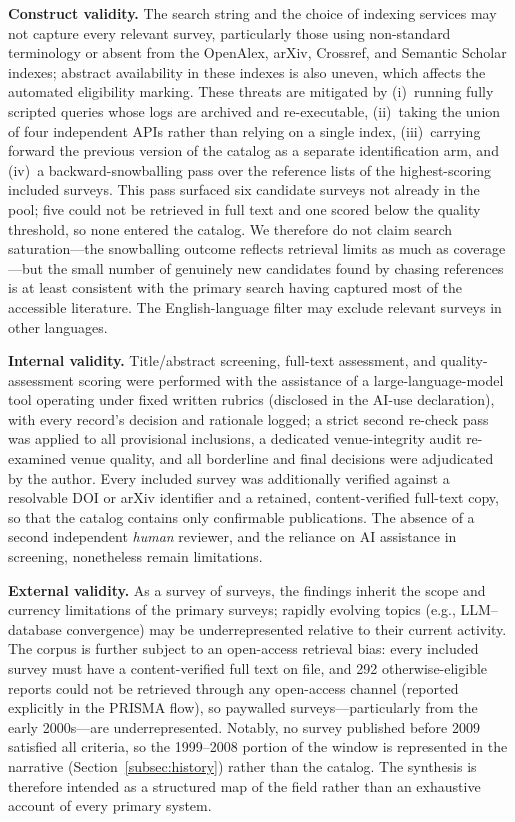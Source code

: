 \documentclass[a4paper,fleqn]{cas-sc}
\begin{document}
\textbf{Construct validity.} The search string and the choice of indexing services may not capture every relevant survey, particularly those using non-standard terminology or absent from the OpenAlex, arXiv, Crossref, and Semantic Scholar indexes; abstract availability in these indexes is also uneven, which affects the automated eligibility marking. These threats are mitigated by (i)~running fully scripted queries whose logs are archived and re-executable, (ii)~taking the union of four independent APIs rather than relying on a single index, (iii)~carrying forward the previous version of the catalog as a separate identification arm, and (iv)~a backward-snowballing pass over the reference lists of the highest-scoring included surveys. This pass surfaced six candidate surveys not already in the pool; five could not be retrieved in full text and one scored below the quality threshold, so none entered the catalog. We therefore do not claim search saturation---the snowballing outcome reflects retrieval limits as much as coverage---but the small number of genuinely new candidates found by chasing references is at least consistent with the primary search having captured most of the accessible literature. The English-language filter may exclude relevant surveys in other languages.

\textbf{Internal validity.} Title/abstract screening, full-text assessment, and quality-assessment scoring were performed with the assistance of a large-language-model tool operating under fixed written rubrics (disclosed in the AI-use declaration), with every record's decision and rationale logged; a strict second re-check pass was applied to all provisional inclusions, a dedicated venue-integrity audit re-examined venue quality, and all borderline and final decisions were adjudicated by the author. Every included survey was additionally verified against a resolvable DOI or arXiv identifier and a retained, content-verified full-text copy, so that the catalog contains only confirmable publications. The absence of a second independent \emph{human} reviewer, and the reliance on AI assistance in screening, nonetheless remain limitations.

\textbf{External validity.} As a survey of surveys, the findings inherit the scope and currency limitations of the primary surveys; rapidly evolving topics (e.g., LLM--database convergence) may be underrepresented relative to their current activity. The corpus is further subject to an open-access retrieval bias: every included survey must have a content-verified full text on file, and 292 otherwise-eligible reports could not be retrieved through any open-access channel (reported explicitly in the PRISMA flow), so paywalled surveys---particularly from the early 2000s---are underrepresented. Notably, no survey published before 2009 satisfied all criteria, so the 1999--2008 portion of the window is represented in the narrative (Section~\ref{subsec:history}) rather than the catalog. The synthesis is therefore intended as a structured map of the field rather than an exhaustive account of every primary system.
\end{document}
